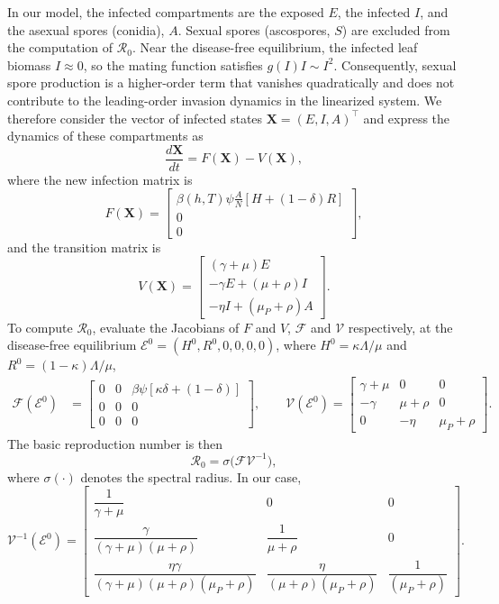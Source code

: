 \documentclass[11pt]{article}
\numberwithin{equation}{section}
\begin{document}
In our model, the infected compartments are the exposed $E$, the infected $I$, and the asexual spores (conidia), $A$. Sexual spores (ascospores, $S$) are excluded from the computation of $\mathcal{R}_0$. Near the disease-free equilibrium, the infected leaf biomass $I \approx 0$, so the mating function satisfies $g(I) I \sim I^2$. Consequently, sexual spore production is a higher-order term that vanishes quadratically and does not contribute to the leading-order invasion dynamics in the linearized system.
We therefore consider the vector of infected states $\mathbf{X} = (E, I, A)^\top$ and express the dynamics of these compartments as
$$\frac{d\mathbf{X}}{dt} = F(\mathbf{X}) - V(\mathbf{X}),$$
where the new infection matrix is
$$F(\mathbf{X}) = \begin{bmatrix}
\beta(h,T) \psi \frac{A}{N} \left[ H + (1 - \delta) R \right] \\
0 \\
0
\end{bmatrix},$$
and the transition matrix is
$$V(\mathbf{X}) = \begin{bmatrix}
(\gamma + \mu) E \\
- \gamma E + (\mu + \rho) I \\
- \eta I + (\mu_P + \rho) A
\end{bmatrix}.$$
To compute $\mathcal{R}_0$, evaluate the Jacobians of $F$ and $V$, $\mathcal{F}$ and $\mathcal{V}$ respectively, at the disease-free equilibrium $\mathcal{E}^0 = (H^0, R^0, 0, 0, 0, 0)$, where $H^0 = \kappa \Lambda / \mu $ and $R^0 = (1 - \kappa) \Lambda / \mu$, 
\begin{align}\label{eqn4}\nonumber
    \mathcal{F}(\mathcal{E}^0)
    &= \begin{bmatrix}
        0&0 & \beta\psi\left[\kappa\delta+(1-\delta)\right]\\
        0 & 0 & 0\\
        0 & 0 & 0
    \end{bmatrix},
    \qquad\mathcal{V}(\mathcal{E}^0)
    = \begin{bmatrix}
        \gamma+\mu & 0 & 0 \\
        -\gamma  & \mu+\rho & 0 \\
        0 & -\eta  & \mu_P+\rho
    \end{bmatrix}.
\end{align}
The basic reproduction number is then
$$\mathcal{R}_0 = \sigma\bigl(\mathcal{F}\mathcal{V}^{-1} \bigr),$$
where $  \sigma(\cdot)  $ denotes the spectral radius. In our case,
\[\mathcal{V}^{-1}(\mathcal{E}^0)
    = \begin{bmatrix}
        \dfrac{1}{\gamma+\mu} & 0 & 0 \\
        \dfrac{\gamma}{(\gamma+\mu)(\mu+\rho)}&\dfrac{1}{\mu+\rho}&0 \\
        \dfrac{\eta\gamma}{(\gamma+\mu)(\mu+\rho)(\mu_P+\rho)} & \dfrac{\eta}{(\mu+\rho)(\mu_P+\rho)} & \dfrac{1}{(\mu_P+\rho)}
    \end{bmatrix}.\]
\end{document}
